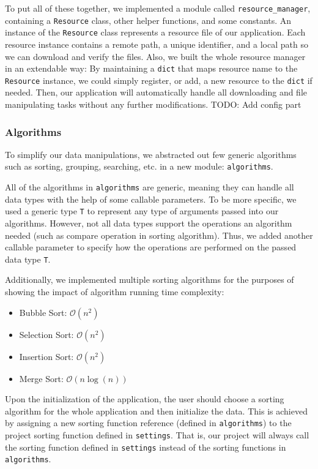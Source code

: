 \documentclass[fontsize=11pt]{article}
\newcommand{\bigO}{\mathcal{O}}
\begin{document}
    To put all of these together, we implemented a module called \verb|resource_manager|, containing a \verb|Resource| class, other helper functions, and some constants. An instance of the \verb|Resource| class represents a resource file of our application. Each resource instance contains a remote path, a unique identifier, and a local path so we can download and verify the files. Also, we built the whole resource manager in an extendable way: By maintaining a \verb|dict| that maps resource name to the \verb|Resource| instance, we could simply register, or add, a new resource to the \verb|dict| if needed. Then, our application will automatically handle all downloading and file manipulating tasks without any further modifications. TODO: Add config part

    \subsubsection{Algorithms}

    To simplify our data manipulations, we abstracted out few generic algorithms such as sorting, grouping, searching, etc. in a new module: \verb|algorithms|.

    All of the algorithms in \verb|algorithms| are generic, meaning they can handle all data types with the help of some callable parameters. To be more specific, we used a generic type \verb|T| to represent any type of arguments passed into our algorithms. However, not all data types support the operations an algorithm needed (such as compare operation in sorting algorithm). Thus, we added another callable parameter to specify how the operations are performed on the passed data type \verb|T|.

    Additionally, we implemented multiple sorting algorithms for the purposes of showing the impact of algorithm running time complexity:
    
    \begin{itemize}
        \item Bubble Sort: $\bigO(n^2)$
        \item Selection Sort: $\bigO(n^2)$
        \item Insertion Sort: $\bigO(n^2)$
        \item Merge Sort: $\bigO(n\log(n))$
    \end{itemize}

    Upon the initialization of the application, the user should choose a sorting algorithm for the whole application and then initialize the data. This is achieved by assigning a new sorting function reference (defined in \verb|algorithms|) to the project sorting function defined in \verb|settings|. That is, our project will always call the sorting function defined in \verb|settings| instead of the sorting functions in \verb|algorithms|.
\end{document}
